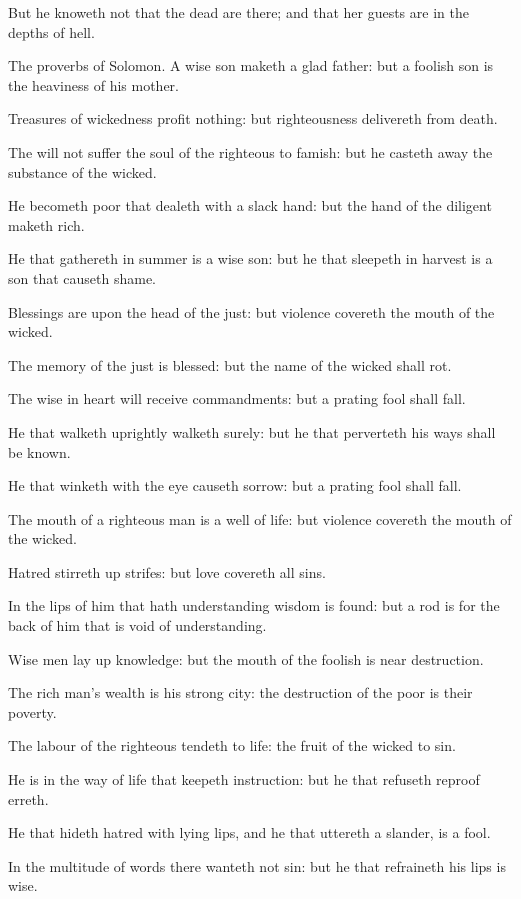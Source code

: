 \Verse But he knoweth not that the dead are there; and that her guests are in the depths of hell.


\Chapter
\Verse The proverbs of Solomon. A wise son maketh a glad father: but a foolish son is the heaviness of his mother.

\Verse Treasures of wickedness profit nothing: but righteousness delivereth from death.

\Verse The \LORD will not suffer the soul of the righteous to famish: but he casteth away the substance of the wicked.

\Verse He becometh poor that dealeth with a slack hand: but the hand of the diligent maketh rich.

\Verse He that gathereth in summer is a wise son: but he that sleepeth in harvest is a son that causeth shame.

\Verse Blessings are upon the head of the just: but violence covereth the mouth of the wicked.

\Verse The memory of the just is blessed: but the name of the wicked shall rot.

\Verse The wise in heart will receive commandments: but a prating fool shall fall.

\Verse He that walketh uprightly walketh surely: but he that perverteth his ways shall be known.

\Verse He that winketh with the eye causeth sorrow: but a prating fool shall fall.

\Verse The mouth of a righteous man is a well of life: but violence covereth the mouth of the wicked.

\Verse Hatred stirreth up strifes: but love covereth all sins.

\Verse In the lips of him that hath understanding wisdom is found: but a rod is for the back of him that is void of understanding.

\Verse Wise men lay up knowledge: but the mouth of the foolish is near destruction.

\Verse The rich man's wealth is his strong city: the destruction of the poor is their poverty.

\Verse The labour of the righteous tendeth to life: the fruit of the wicked to sin.

\Verse He is in the way of life that keepeth instruction: but he that refuseth reproof erreth.

\Verse He that hideth hatred with lying lips, and he that uttereth a slander, is a fool.

\Verse In the multitude of words there wanteth not sin: but he that refraineth his lips is wise.

